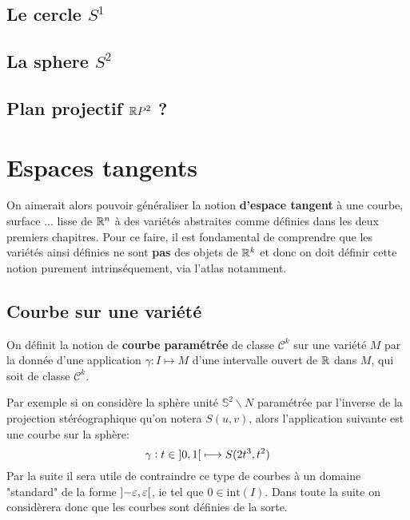    \section{Le cercle \( S^1 \)}
   \section{La sphere \( S^2 \)}
   \section{Plan projectif \( \mathbb{R} P^2 \) ?}
\chapter{Espaces tangents}
On aimerait alors pouvoir généraliser la notion \textbf{d'espace tangent} à une courbe, surface ... lisse de \( \mathbb{R}^n \) à des variétés abstraites comme définies dans les deux premiers chapitres. Pour ce faire, il est fondamental de comprendre que les variétés ainsi définies ne sont \textbf{pas} des objets de \( \mathbb{R}^k \) et donc on doit définir cette notion purement intrinséquement, via l'atlas notamment.

\section{Courbe sur une variété}
On définit la notion de \textbf{courbe paramétrée} de classe \( \mathcal{C}^k \) sur une variété \( M \) par la donnée d'une application \( \gamma : I \longmapsto M \) d'une intervalle ouvert de \( \mathbb{R} \) dans \( M \), qui soit  de classe \( \mathcal{C}^k \).\<

Par exemple si on considère la sphère unité \(\mathbb{S}^2 \backslash N\) paramétrée par l'inverse de la projection stéréographique qu'on notera \( S(u, v) \), alors l'application suivante est une courbe sur la sphère:
\[ 
   \gamma : t \in \ioo{0}{1} \longmapsto S(2t^3, t^2)
\]
Par la suite il sera utile de contraindre ce type de courbes à un domaine "standard" de la forme \( \ioo{- \epsilon}{ \epsilon} \), ie tel que \( 0 \in \text{int}(I) \). Dans toute la suite on considèrera donc que les courbes sont définies de la sorte. 
